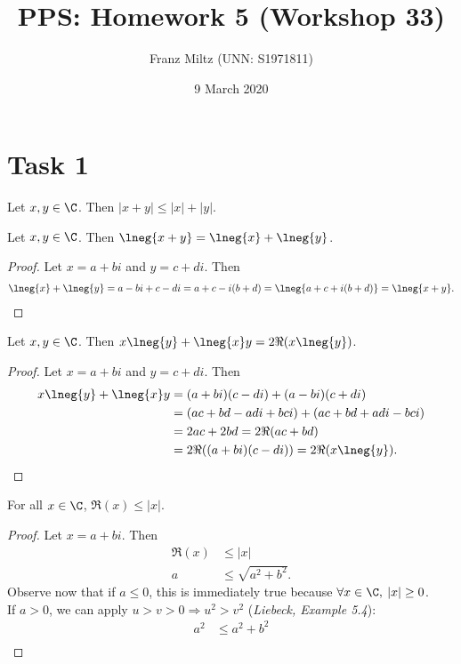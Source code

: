 \documentclass{article}
\title{PPS: Homework 5 (Workshop 33)}
\author{Franz Miltz (UNN: S1971811)}
\date{9 March 2020}
\begin{document}
\maketitle
\section*{Task 1}
\begin{claim}
  Let $x,y\in\C$. Then $|x+y|\leq |x|+|y|$.
\end{claim}
\begin{adjustwidth}{2em}{0pt}
  \begin{lemma}
    \label{l1}
    Let $x,y\in\C$. Then $\lneg{x+y}=\lneg{x}+\lneg{y}$. 
  \end{lemma}
  \begin{proof}
    Let $x=a+bi$ and $y=c+di$. Then
    \begin{align*}
      \lneg{x}+\lneg{y}=a-bi+c-di=a+c-i(b+d)=\lneg{a+c+i(b+d)}=\lneg{x+y}.
    \end{align*}
  \end{proof}
  \begin{lemma}
    \label{l2}
    Let $x,y\in\C$. Then $x\lneg{y}+\lneg{x}y=2\Re({x\lneg{y}})$.
  \end{lemma}
  \begin{proof}
    Let $x=a+bi$ and $y=c+di$. Then
    \begin{align*}
      x\lneg{y}+\lneg{x}y&=(a+bi)(c-di)+(a-bi)(c+di)\\
      &=(ac+bd-adi+bci)+(ac+bd+adi-bci)\\
      &=2ac+2bd=2\Re(ac+bd)\\
      &=2\Re((a+bi)(c-di))=2\Re(x\lneg{y}).
    \end{align*}
  \end{proof}
  \begin{lemma}
    \label{l3}
    For all $x\in\C$, $\Re(x)\leq|x|$.
  \end{lemma}
  \begin{proof}
    Let $x=a+bi$. Then
    \begin{align*}
      \Re(x)&\leq|x|\\
      a&\leq \sqrt{a^2+b^2}.
    \end{align*}
    Observe now that if $a\leq0$, this is immediately true because $\forall x\in\C,\:|x|\geq 0$.\\
    If $a>0$, we can apply $u>v>0\Rightarrow u^2>v^2$ (\emph{Liebeck, Example 5.4}):
    \begin{align*}
      a^2&\leq a^2+b^2\\

\end{align*}
\end{proof}
\end{adjustwidth}
\end{document}

